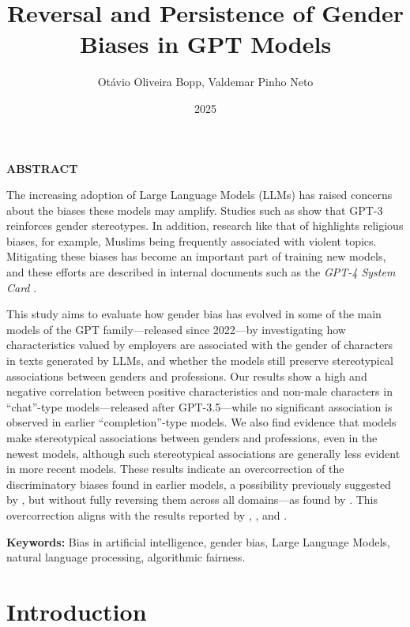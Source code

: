 \documentclass[12pt,a4paper]{article}
\title{Reversal and Persistence of Gender Biases in GPT Models}
\author{Otávio Oliveira Bopp, Valdemar Pinho Neto}
\date{2025}
\begin{document}
\maketitle


\noindent\textbf{ABSTRACT}

\medskip

\noindent The increasing adoption of Large Language Models (LLMs) has raised concerns about the biases these models may amplify. Studies such as \citet{lucy2021} show that GPT-3 reinforces gender stereotypes. In addition, research like that of \citet{abid2021} highlights religious biases, for example, Muslims being frequently associated with violent topics. Mitigating these biases has become an important part of training new models, and these efforts are described in internal documents such as the \textit{GPT-4 System Card} \citep{openai2023}.

This study aims to evaluate how gender bias has evolved in some of the main models of the GPT family---released since 2022---by investigating how characteristics valued by employers are associated with the gender of characters in texts generated by LLMs, and whether the models still preserve stereotypical associations between genders and professions. Our results show a high and negative correlation between positive characteristics and non-male characters in ``chat''-type models---released after GPT-3.5---while no significant association is observed in earlier ``completion''-type models. We also find evidence that models make stereotypical associations between genders and professions, even in the newest models, although such stereotypical associations are generally less evident in more recent models. These results indicate an overcorrection of the discriminatory biases found in earlier models, a possibility previously suggested by \citet{liu2025}, but without fully reversing them across all domains---as found by \citet{joshi2024}. This overcorrection aligns with the results reported by \citet{mirza2024}, \citet{wang2024}, and \citet{karvonen2025}.

\medskip

\noindent\textbf{Keywords:} Bias in artificial intelligence, gender bias, Large Language Models, natural language processing, algorithmic fairness.

\newpage
\tableofcontents
\newpage

\section{Introduction}
\end{document}
